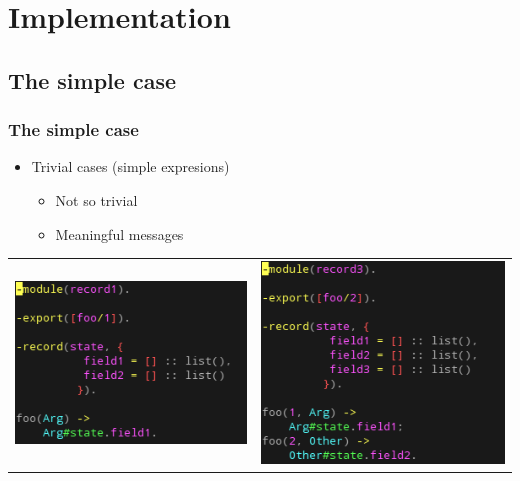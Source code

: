 \section{Implementation}

\subsection[The simple case]{The simple case}
\begin{frame}
\frametitle{The simple case}

\begin{itemize}
	\item Trivial cases (simple expresions)
	\begin{itemize}
		\item Not so trivial
		\item Meaningful messages
	\end{itemize}
\end{itemize}

\begin{center}
\begin{tabular}{ c c }
  	\includegraphics[scale=0.45]{../figures/test1}
&
  	\includegraphics[scale=0.45]{../figures/test2}
\end{tabular}
\end{center}

\end{frame}

